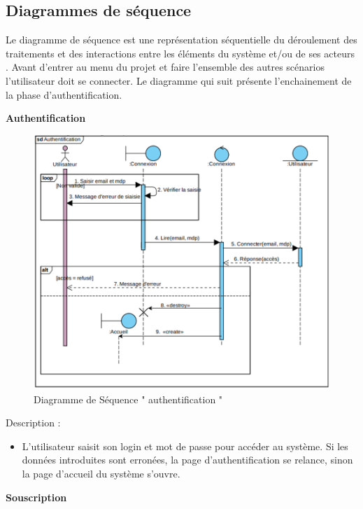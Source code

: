 \subsection{	Diagrammes de séquence }
\hspace{4mm}Le diagramme de séquence est une représentation séquentielle du déroulement des traitements et des interactions entre les éléments du système et/ou de ses acteurs \cite{14}. Avant d'entrer au menu du projet et faire l'ensemble des autres scénarios l'utilisateur doit se connecter. Le diagramme qui suit présente l'enchainement de la phase d'authentification. 
\newpage\par \textbf{	Authentification }
\begin{figure}[h]
    \centering
    \includegraphics{figures/3anis5.png}
    \caption{Diagramme de Séquence " authentification "}
    \label{fig:Séquence_authentification}
\end{figure}
\par Description : 
\begin{itemize}
    \item L’utilisateur saisit son login et mot de passe pour accéder au système. Si les données introduites sont erronées, la page d’authentification se relance, sinon la page d’accueil du système s’ouvre.
\end{itemize}
\newpage\par \textbf{	Souscription  }
